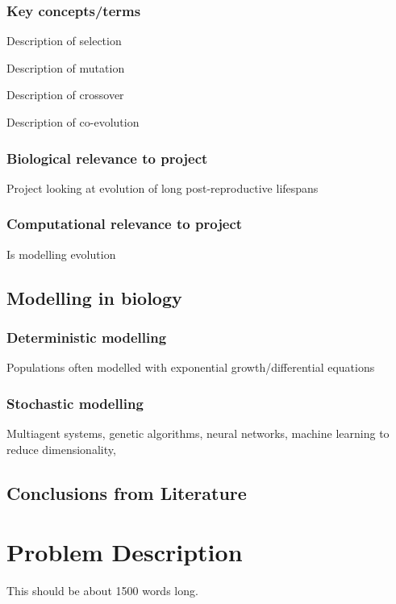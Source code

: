 \documentclass[authoryearcitations]{UoYCSproject}
\begin{document}
\subsection{Key concepts/terms}
\begin{description}[style=nextline]
\item[Selection] Description of selection

\item [Mutation] Description of mutation

\item [Crossover] Description of crossover

\item [Coevolution] Description of co-evolution
\end{description}

\subsection{Biological relevance to project}
Project looking at evolution of long post-reproductive lifespans

\subsection{Computational relevance to project}
Is modelling evolution

\section{Modelling in biology}

\subsection{Deterministic modelling}
Populations often modelled with exponential growth/differential equations

\subsection{Stochastic modelling}
Multiagent systems, genetic algorithms, neural networks, machine learning to reduce dimensionality,

\section{Conclusions from Literature}


\chapter{Problem Description}
\label{cha:Problem Description}
This should be about 1500 words long.
\end{document}
